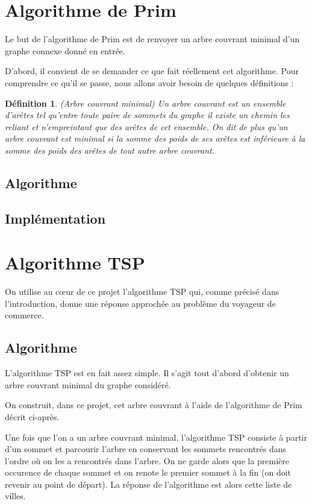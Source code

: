 \documentclass{article}
\newtheorem*{ddef}{Définition}
\begin{document}
\section{Algorithme de Prim}
Le but de l'algorithme de Prim est de renvoyer un arbre couvrant minimal d'un graphe connexe donné en entrée.

D'abord, il convient de se demander ce que fait réellement cet algorithme. Pour comprendre ce qu'il se passe, nous allons avoir besoin de quelques définitions :

\begin{ddef}(Arbre couvrant minimal)
 Un arbre couvrant est un ensemble d'arêtes tel qu'entre toute paire de sommets du graphe il existe un chemin les reliant et n'empreintant que des arêtes de cet
 ensemble.
 On dit de plus qu'un arbre couvrant est minimal si la somme des poids de ses arêtes est inférieure à la somme des poids des arêtes de tout autre arbre couvrant.
\end{ddef}

\subsection{Algorithme}

\subsection{Implémentation}

\section{Algorithme TSP}
On utilise au c\oe ur de ce projet l'algorithme TSP qui, comme précisé dans l'introduction, donne une réponse approchée au problème du voyageur de commerce.

\subsection{Algorithme}
L'algorithme TSP est en fait assez simple. Il s'agit tout d'abord d'obtenir un arbre couvrant minimal du graphe considéré.


On construit, dans ce projet, cet arbre couvrant à l'aide de l'algorithme de Prim décrit ci-après.

Une fois que l'on a un arbre couvrant minimal, l'algorithme TSP consiste à partir d'un sommet et parcourir l'arbre en conservant les sommets rencontrés dans l'ordre où 
on les a rencontrés dans l'arbre. On ne garde alors que la première occurence de chaque sommet et on renote le premier sommet à la fin (on doit revenir au point de 
départ). La réponse de l'algorithme est alors cette liste de villes.
\end{document}
